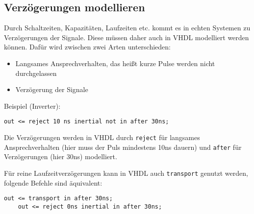\subsection{Verzögerungen modellieren}
Durch Schaltzeiten, Kapazitäten, Laufzeiten etc. kommt es in echten Systemen zu Verzögerungen der Signale. Diese müssen daher auch in VHDL modelliert werden können.
Dafür wird zwischen zwei Arten unterschieden:
\begin{itemize}
    \item Langsames Ansprechverhalten, das heißt kurze Pulse werden nicht durchgelassen
    \item Verzögerung der Signale
\end{itemize}
Beispiel (Inverter):
\begin{lstlisting}[style=vhdl]
    out <= reject 10 ns inertial not in after 30ns;
\end{lstlisting}
Die Verzögerungen werden in VHDL durch \lstinline[style=vhdl]{reject} für langsames Ansprechverhalten (hier muss der Puls mindestens 10ns dauern) 
und \lstinline[style=vhdl]{after} für Verzögerungen (hier 30ns) modelliert.

Für reine Laufzeitverzögerungen kann in VHDL auch \lstinline[style=vhdl]{transport} genutzt werden, folgende Befehle sind äquivalent:
\begin{lstlisting}[style=vhdl]
    out <= transport in after 30ns;
    out <= reject 0ns inertial in after 30ns;
\end{lstlisting}

